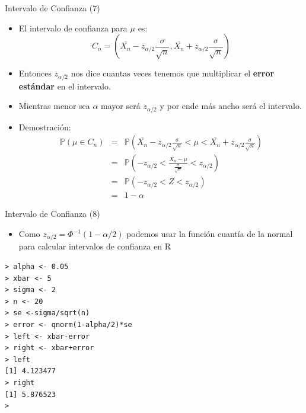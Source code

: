 \documentclass[handout]{beamer}
\begin{document}
\begin{frame}{Intervalo de Confianza (7)}
\scriptsize{
\begin{itemize}
 \item  El intervalo de confianza para $\mu$ es:
 \begin{displaymath}
 C_n = (\overline{X_{n}}-z_{\alpha/2}\frac{\sigma}{\sqrt{n}} , \overline{X_{n}} + z_{\alpha/2}\frac{\sigma}{\sqrt{n}}) 
 \end{displaymath}
\item Entonces $ z_{\alpha/2}$ nos dice cuantas veces tenemos que multiplicar el \textbf{error estándar} en el intervalo.
\item Mientras menor sea $\alpha$ mayor será $ z_{\alpha/2}$ y por ende más ancho será el intervalo. 
\item Demostración:
 \begin{eqnarray*}
 \mathbb{P}(\mu \in C_n) & = & \mathbb{P}(\overline{X_{n}}-z_{\alpha/2}\frac{\sigma}{\sqrt{n}} < \mu < \overline{X_{n}} + z_{\alpha/2}\frac{\sigma}{\sqrt{n}}) \nonumber \\ 
                         & = & \mathbb{P}(-z_{\alpha/2} < \frac{\overline{X_{n}}-\mu}{\frac{\sigma}{\sqrt{n}}} <  z_{\alpha/2}) \nonumber \\ 
			  & = & \mathbb{P}(-z_{\alpha/2} < Z <  z_{\alpha/2}) \nonumber \\
			   & = & 1-\alpha 
 \end{eqnarray*}


\end{itemize}
}


 
\end{frame}

\begin{frame}[fragile]{Intervalo de Confianza (8) }

\scriptsize{
\begin{itemize}
 \item Como $z_{\alpha/2} = \Phi^{-1}(1-\alpha/2)$ podemos usar la función cuantía de la normal para calcular intervalos de confianza en R
\end{itemize}


\begin{verbatim}
> alpha <- 0.05
> xbar <- 5
> sigma <- 2
> n <- 20
> se <-sigma/sqrt(n)
> error <- qnorm(1-alpha/2)*se
> left <- xbar-error
> right <- xbar+error
> left
[1] 4.123477
> right
[1] 5.876523
>
\end{verbatim}
}



\end{frame}
\end{document}
